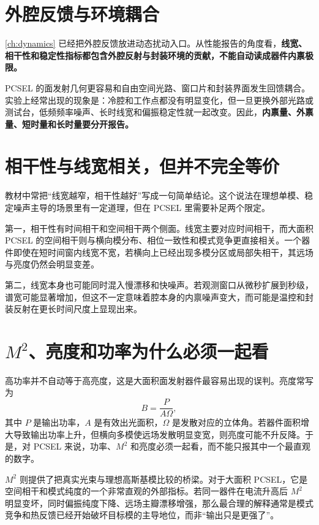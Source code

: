 \section{外腔反馈与环境耦合}
\cref{ch:dynamics} 已经把外腔反馈放进动态扰动入口。从性能报告的角度看，\textbf{线宽、相干性和稳定性指标都包含外腔反射与封装环境的贡献，不能自动读成器件内禀极限。}

PCSEL 的面发射几何更容易和自由空间光路、窗口片和封装界面发生回馈耦合。实验上经常出现的现象是：冷腔和工作点都没有明显变化，但一旦更换外部光路或测试台，低频频率噪声、长时线宽和偏振稳定性就一起改变。因此，\textbf{内禀量、外禀量、短时量和长时量要分开报告。}

\section{相干性与线宽相关，但并不完全等价}
教材中常把“线宽越窄，相干性越好”写成一句简单结论。这个说法在理想单模、稳定噪声主导的场景里有一定道理，但在 PCSEL 里需要补足两个限定。

第一，相干性有时间相干和空间相干两个侧面。线宽主要对应时间相干，而大面积 PCSEL 的空间相干则与横向模分布、相位一致性和模式竞争更直接相关。一个器件即使在短时间窗内线宽不宽，若横向上已经出现多模分区或局部失相干，其远场与亮度仍然会明显变差。

第二，线宽本身也可能同时混入慢漂移和快噪声。若观测窗口从微秒扩展到秒级，谱宽可能显著增加，但这不一定意味着腔本身的内禀噪声变大，而可能是温控和封装反射在更长时间尺度上显现出来。

\section{\texorpdfstring{$M^2$}{M-squared}、亮度和功率为什么必须一起看}
高功率并不自动等于高亮度，这是大面积面发射器件最容易出现的误判。亮度常写为
\begin{equation}
B = \frac{P}{A\Omega},
\label{eq:brightness_def}
\end{equation}
其中 $P$ 是输出功率，$A$ 是有效出光面积，$\Omega$ 是发散对应的立体角。若器件面积增大导致输出功率上升，但横向多模使远场发散明显变宽，则亮度可能不升反降。于是，对 PCSEL 来说，功率、$M^2$ 和亮度必须一起看，而不能只报其中一个最直观的数字。

$M^2$ 则提供了把真实光束与理想高斯基模比较的桥梁。对于大面积 PCSEL，它是空间相干和模式纯度的一个非常直观的外部指标。若同一器件在电流升高后 $M^2$ 明显变坏，同时偏振纯度下降、远场主瓣漂移增强，那么最合理的解释通常是模式竞争和热反馈已经开始破坏目标模的主导地位，而非“输出只是更强了”。

